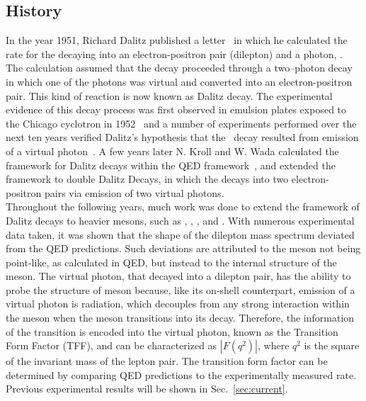 \subsection{History}
\indent In the year 1951, Richard Dalitz published a letter~\cite{Dalitz} in which he calculated the rate for the \pizT  decaying into an electron-positron pair (dilepton) and a photon, \pizDal. The calculation assumed that the decay proceeded through a two–photon decay in which one of the photons was virtual and converted into an electron-positron pair.  This kind of reaction is now known as Dalitz decay. The experimental evidence of this decay process was first observed in emulsion plates exposed to the Chicago cyclotron in 1952~\cite{Lord} and a number of experiments performed over the next ten years verified Dalitz’s hypothesis that the \pizDal \ decay resulted from emission of a virtual photon~\cite{Samios,Lindenfeld,Sargent}. A few years later N. Kroll and W. Wada calculated the framework for Dalitz decays within the QED framework~\cite{KrollWada}, and extended the framework to double Dalitz Decays, in which the \pizT decays into two electron-positron pairs via emission of two virtual photons. \\
\indent Throughout the following years, much work was done to extend the framework of Dalitz decays to heavier mesons, such as \etaT, \omT, \etaTP, and \phiT. With numerous experimental data taken, it was shown that the shape of the dilepton mass spectrum deviated from the QED predictions. Such deviations are attributed to the meson not being point-like, as calculated in QED, but instead to the internal structure of the meson. The virtual photon, that decayed into a dilepton pair, has the ability to probe the structure of meson because, like its on-shell counterpart, emission of a  virtual photon is radiation, which decouples from any strong interaction within the meson when the meson transitions into its decay. Therefore, the information of the transition is encoded into the virtual photon, known as the Transition Form Factor (TFF), and can be characterized as $\left| F(q^2)\right|$, where $q^2$ is the square of the invariant mass of the lepton pair. The transition form factor can be determined by comparing QED predictions to the experimentally measured rate. Previous experimental results will be shown in Sec.~\ref{sec:current}.

